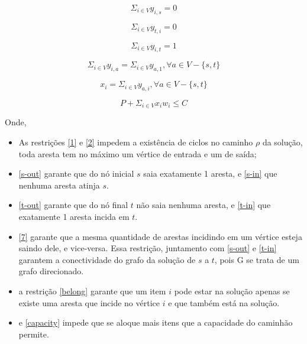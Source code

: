 \documentclass[conference]{IEEEtran}
\begin{document}
    \begin{equation}
        \Sigma_{i \in V} y_{i,s} = 0
        \label{s-in}
    \end{equation}

    \begin{equation}
        \Sigma_{i \in V} y_{t,i} = 0
        \label{t-out}
    \end{equation}

    \begin{equation}
        \Sigma_{i \in V} y_{i,t} = 1
        \label{t-in}
    \end{equation}

    \begin{equation}
        \Sigma_{i \in V} y_{i,a} = \Sigma_{i \in V} y_{a,1}, \forall a \in V - \{s,t\}
        \label{7}
    \end{equation}

    \begin{equation}
        x_i = \Sigma_{i \in V} y_{a,i}, \forall a \in V - \{s,t\}
        \label{belong}
    \end{equation}

    \begin{equation}
        P + \Sigma_{i \in  V}x_i w_i \leq C
        \label{capacity}
    \end{equation}

    Onde,

    \begin{itemize}
        \item As restrições \ref{1} e \ref{2} impedem a existência de ciclos no caminho $\rho$ da solução, toda aresta tem no máximo um vértice de entrada e um de saída;
        \item \ref{s-out} garante que do nó inicial $s$ saia  exatamente 1 aresta, e \ref{s-in} que nenhuma aresta atinja  $s$.
        \item \ref{t-out} garante que do nó final $t$ não saia  nenhuma aresta, e \ref{t-in} que exatamente 1 aresta incida em $t$.
        \item \ref{7} garante que a mesma quantidade de arestas incidindo em um vértice esteja saindo dele, e vice-versa. Essa restrição, juntamento com \ref{s-out} e \ref{t-in} garantem a conectividade do grafo da solução de $s$ a $t$, pois G se trata de um grafo direcionado.
        \item a restrição \ref{belong} garante que um item $i$ pode estar na solução apenas se existe uma aresta que incide no vértice $i$ e que também está na solução.
        \item e \ref{capacity} impede que se aloque mais itens que a capacidade do caminhão permite.

    \end{itemize}
\end{document}
